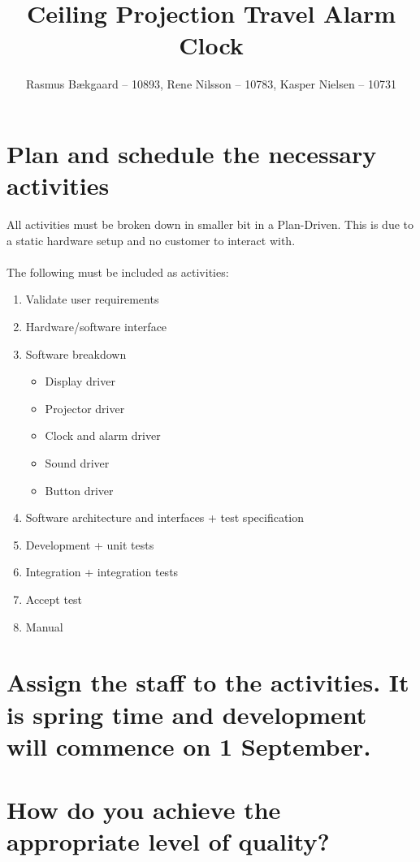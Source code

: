 \documentclass[10pt, a4]{article}
\title{Ceiling Projection Travel Alarm Clock}
\author{Rasmus Bækgaard -- 10893, Rene Nilsson -- 10783, Kasper Nielsen -- 10731}
\begin{document}
\maketitle


\section{Plan and schedule the necessary activities} 

All activities must be broken down in smaller bit in a Plan-Driven.
This is due to a static hardware setup and no customer to interact with.
\\
\\
The following must be included as activities:
\begin{enumerate}
	\item Validate user requirements
	\item Hardware/software interface
	\item Software breakdown
	\begin{itemize}
		\item Display driver
		\item Projector driver
		\item Clock and alarm driver
		\item Sound driver
		\item Button driver
	\end{itemize}
	\item Software architecture and interfaces + test specification
	\item Development + unit tests
	\item Integration + integration tests
	\item Accept test
	\item Manual
\end{enumerate}





\section{Assign the staff to the activities. It is spring time and development will commence on 1 September.}



\section{How do you achieve the appropriate level of quality?}
\end{document}
